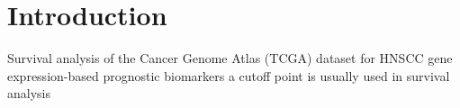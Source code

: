 \documentclass[
paper=landscape,
paper=160mm:90mm, %
fontsize=11pt, %
pagesize, %
parskip=half-, %
]{scrartcl} %
\theoremstyle{mythmstyle} %
\begin{document}
\thispagestyle{empty} %

\small\tableofcontents %

\clearpage








\section{Introduction}

\begin{outline}
    \1 Survival analysis of the Cancer Genome Atlas (TCGA) dataset for HNSCC
        \2 gene expression-based prognostic biomarkers
        \2 a cutoff point is usually used in survival analysis
\end{outline}

\clearpage
\end{document}
